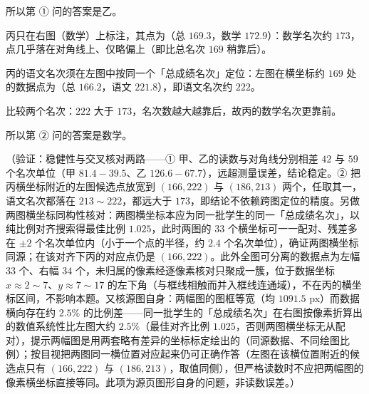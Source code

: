 \begin{answer}
所以第 ① 问的答案是乙。


丙只在右图（数学）上标注，其点为（总 \(169.3\)，数学 \(172.9\)）：数学名次约 \(173\)，点几乎落在对角线上、仅略偏上（即比总名次 \(169\) 稍靠后）。

丙的语文名次须在左图中按同一个「总成绩名次」定位：左图在横坐标约 \(169\) 处的数据点为（总 \(166.2\)，语文 \(221.8\)），即语文名次约 \(222\)。

比较两个名次：\(222\) 大于 \(173\)，名次数越大越靠后，故丙的数学名次更靠前。

所以第 ② 问的答案是数学。

（验证：稳健性与交叉核对两路——① 甲、乙的读数与对角线分别相差 \(42\) 与 \(59\) 个名次单位（甲 \(81.4-39.5\)、乙 \(126.6-67.7\)），远超测量误差，结论稳定。② 把丙横坐标附近的左图候选点放宽到 \((166,222)\) 与 \((186,213)\) 两个，任取其一，语文名次都落在 \(213\sim222\)，都远大于 \(173\)，即结论不依赖跨图定位的精度。另做两图横坐标同构性核对：两图横坐标本应为同一批学生的同一「总成绩名次」，以纯比例对齐搜索得最佳比例 \(1.025\)，此时两图的 \(33\) 个横坐标可一一配对、残差多在 \(\pm2\) 个名次单位内（小于一个点的半径，约 \(2.4\) 个名次单位），确证两图横坐标同源；在该对齐下丙的对应点仍是 \((166,222)\)。此外全图可分离的数据点为左幅 \(33\) 个、右幅 \(34\) 个，未归属的像素经逐像素核对只聚成一簇，位于数据坐标 \(x\approx2\sim7\)、\(y\approx7\sim17\) 的左下角（与框线相触而并入框线连通域），不在丙的横坐标区间，不影响本题。又核源图自身：两幅图的图框等宽（均 \(1091.5\) px）而数据横向存在约 \(2.5\%\) 的比例差——同一批学生的「总成绩名次」在右图按像素折算出的数值系统性比左图大约 \(2.5\%\)（最佳对齐比例 \(1.025\)，否则两图横坐标无从配对），提示两幅图是用两套略有差异的坐标标定绘出的（同源数据、不同绘图比例）；按目视把两图同一横位置对应起来仍可正确作答（左图在该横位置附近的候选点只有 \((166,222)\) 与 \((186,213)\)，取值同侧），但严格读数时不应把两幅图的像素横坐标直接等同。此项为源页图形自身的问题，非读数误差。）


\end{answer}
